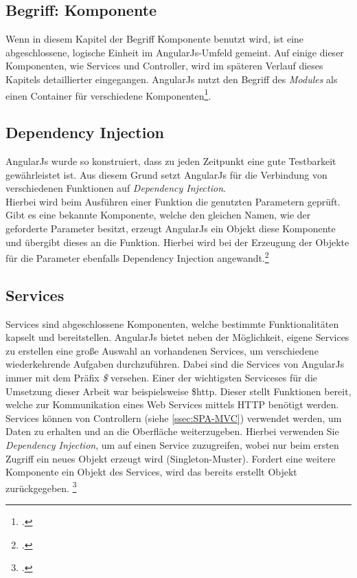 \subsection{Begriff: Komponente}
Wenn in diesem Kapitel der Begriff Komponente benutzt wird, ist eine abgeschlossene, logische Einheit im AngularJs-Umfeld gemeint. Auf einige dieser Komponenten, wie Services und Controller, wird im späteren Verlauf dieses Kapitels detaillierter eingegangen. AngularJs nutzt den Begriff des \textit{Modules} als einen Container für verschiedene Komponenten\footcite{online:angular:module}. 
\subsection{Dependency Injection}
\label{ssec:SPA-Dependency-Injection}
AngularJs wurde so konstruiert, dass zu jeden Zeitpunkt eine gute Testbarkeit gewährleistet ist. Aus diesem Grund setzt AngularJs für die Verbindung von verschiedenen Funktionen auf \textit{Dependency Injection}. \\ Hierbei wird beim Ausführen einer Funktion die genutzten Parametern geprüft. Gibt es eine bekannte Komponente, welche den gleichen Namen, wie der geforderte Parameter besitzt, erzeugt AngularJs ein Objekt diese Komponente und übergibt dieses an die Funktion. Hierbei wird bei der Erzeugung der Objekte für die Parameter ebenfalls Dependency Injection angewandt.\footcite{online:angularjs:dependency-injection}
\subsection{Services}
\label{ssec:SPA-Services}
Services sind abgeschlossene Komponenten, welche bestimmte Funktionalitäten kapselt und bereitstellen. AngularJs bietet neben der Möglichkeit, eigene Services zu erstellen eine große Auswahl an vorhandenen Services, um verschiedene wiederkehrende Aufgaben durchzuführen. Dabei sind die Services von AngularJs immer mit dem Präfix \textit{\$} versehen. Einer der wichtigsten Serviceses für die Umsetzung dieser Arbeit war beispielsweise \$http. Dieser stellt Funktionen bereit, welche zur Kommunikation eines Web Services mittels HTTP benötigt werden. \\
Services können von Controllern (siehe \ref{ssec:SPA-MVC}) verwendet werden, um Daten zu erhalten und an die Oberfläche weiterzugeben. Hierbei verwenden Sie \textit{Dependency Injection}, um auf einen Service zuzugreifen, wobei nur beim ersten Zugriff ein neues Objekt erzeugt wird (\ac{Singleton}-Muster). Fordert eine weitere Komponente ein Objekt des Services, wird das bereits erstellt Objekt zurückgegeben. \footcite{online:angular:services}
